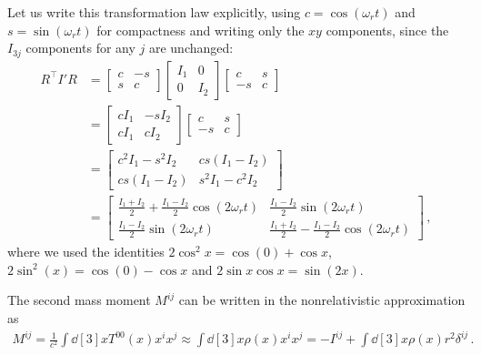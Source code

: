 \documentclass[main.tex]{subfiles}
\begin{document}
Let us write this transformation law explicitly, using \(c = \cos(\omega_{r}t)\) and \(s = \sin(\omega_{r}t)\) for compactness and writing only the \(xy\) components, since the \(I_{3j}\) components for any \(j\) are unchanged: 
%
\begin{align}
R^{\top} I' R &= \left[\begin{array}{cc}
c & -s \\ 
s & c
\end{array}\right]
\left[\begin{array}{cc}
I_1  & 0 \\ 
0 & I_2 
\end{array}\right]
\left[\begin{array}{cc}
c & s \\ 
-s & c
\end{array}\right]  \\
&= \left[\begin{array}{cc}
c I_1  & -s I_2  \\ 
cI_1  & c I_2 
\end{array}\right]
\left[\begin{array}{cc}
c & s \\ 
-s & c
\end{array}\right]  \\
&= \left[\begin{array}{cc}
c^2 I_1 - s^2 I_2  & cs (I_1 - I_2 )  \\ 
cs (I_1 - I_2 ) & s^2 I_1 - c^2 I_2 
\end{array}\right]  \\
&= \left[\begin{array}{cc}
\frac{I_1 + I_2 }{2} + \frac{I_1 - I_2 }{2} \cos(2 \omega_{r}t) 
& \frac{I_1 - I_2 }{2} \sin(2 \omega_{r} t) \\ 
\frac{I_1 - I_2 }{2} \sin(2 \omega_{r} t) 
& \frac{I_1 + I_2 }{2} - \frac{I_1 - I_2 }{2} \cos(2 \omega_{r}t)
\end{array}\right]
\,,
\end{align}
%
where we used the identities \(2\cos^2x = \cos(0) + \cos x\), \(2 \sin^2(x) = \cos(0) - \cos x\) and \(2 \sin x \cos x = \sin (2x) \).

The second mass moment \(M^{ij}\) can be written in the nonrelativistic approximation as
%
\begin{align}
M^{ij} = \frac{1}{c^2} \int \dd[3]{x} T^{00} (x) x^{i} x^{j} 
\approx \int \dd[3]{x} \rho (x) x^{i} x^{j} =
 - I^{ij} + \int \dd[3]{x} \rho (x) r^2 \delta^{ij}
\,.
\end{align}
\end{document}
